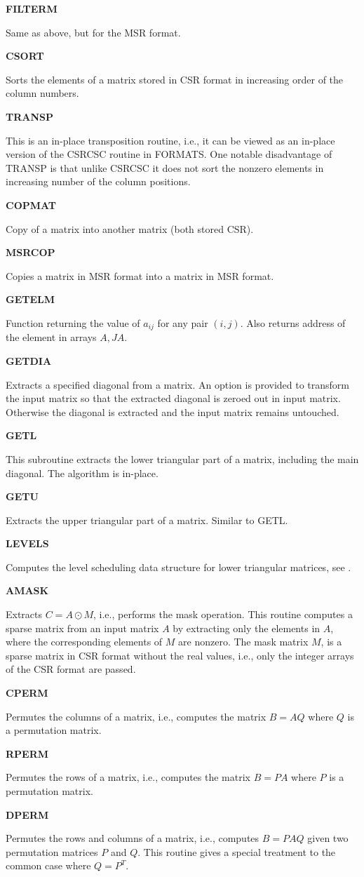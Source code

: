 \documentclass[12pt]{article}
\def\marg#1{\parbox[b]{1.3in}{\bf #1}}
\def\disp#1{\parbox[t]{4.62in}{#1} \vskip 0.2in }
\begin{document}
\marg{FILTERM}\disp{Same as above, but for the MSR format.}

\marg{CSORT}\disp{Sorts the elements of a matrix stored in
CSR format in increasing order of the column numbers. }

\marg{ TRANSP  }\disp{ This is an in-place transposition routine,
i.e., it can be viewed as an in-place version of the CSRCSC 
routine in FORMATS.
One notable disadvantage of  TRANSP is that unlike CSRCSC it 
does not sort the
nonzero elements in increasing number of the column positions.} 

\marg{ COPMAT  }\disp{Copy of a matrix into another 
matrix (both stored CSR).}

\marg{MSRCOP}\disp{Copies a matrix in MSR format into a matrix in MSR format.}
\marg{ GETELM }\disp{Function returning 
the value of $a_{ij}$ for any pair $(i,j)$. Also returns address
of the element in arrays $A, JA$. }

\marg{ GETDIA  }\disp{ Extracts a specified diagonal from a matrix.
An option is provided to transform the input matrix so that the 
extracted diagonal is zeroed out in input matrix. Otherwise the diagonal 
is extracted and the input matrix remains untouched.}

\marg{ GETL    }\disp{This subroutine extracts the
lower triangular part of a matrix, including the main diagonal.
The algorithm is in-place.}

\marg{ GETU    }\disp{Extracts the upper triangular part of
a matrix. Similar to GETL.}

\marg{ LEVELS  }\disp{ 
Computes the level scheduling data structure for lower
triangular matrices, see \cite{Anderson-Saad}.} 

\marg{ AMASK   }\disp{ Extracts    $ C = A \odot M  $,
i.e., performs the mask operation. 
This routine computes a sparse matrix from an input matrix $A$ by 
extracting only the elements in $A$, where the corresponding
elements of $M$ are nonzero. The mask matrix $M$, is a
sparse matrix in CSR format without the real values, i.e.,
only the integer arrays of the CSR format are passed. }

\marg{ CPERM   }\disp{ Permutes the columns of a matrix, i.e.,
computes the matrix $B = A Q$ where $Q$ is a permutation matrix. }

\marg{RPERM}\disp{ Permutes the rows of a matrix, i.e.,
computes the matrix $B = P A$ where $P$ is a permutation matrix. }

\marg{DPERM}\disp{Permutes the rows and columns of
a matrix, i.e., computes $B = P A Q$
given two permutation matrices  $ P$ and $ Q$. This routine gives a
special treatment to the common case where $Q=P^T$.} 
\end{document}
